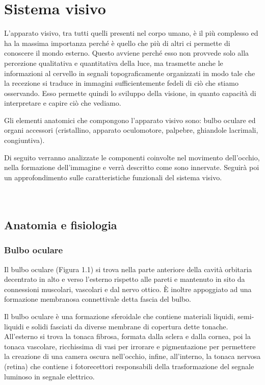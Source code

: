 
\chapter{Sistema visivo}

L’apparato visivo, tra tutti quelli presenti nel corpo umano, è il più complesso ed ha la massima importanza perché è quello che più di altri ci permette di conoscere il mondo esterno. Questo avviene perché esso non provvede solo alla percezione qualitativa e quantitativa della luce, ma trasmette anche le informazioni al cervello in segnali topograficamente organizzati in modo tale che la recezione si traduce in immagini sufficientemente fedeli di ciò che stiamo osservando. Esso permette quindi lo sviluppo della visione, in quanto capacità di interpretare e capire ciò che vediamo.

Gli elementi anatomici che compongono l’apparato visivo sono: bulbo oculare ed organi accessori (cristallino, apparato oculomotore, palpebre, ghiandole lacrimali, congiuntiva).

Di seguito verranno analizzate le componenti coinvolte nel movimento dell’occhio, nella formazione dell’immagine e verrà descritto come sono innervate. Seguirà  poi un approfondimento sulle caratteristiche funzionali del sistema visivo.
\\\ \\\
\section{Anatomia e fisiologia}

\subsection{Bulbo oculare}

Il bulbo oculare (Figura 1.1) si trova nella parte anteriore della cavità orbitaria decentrato in alto e verso l’esterno rispetto alle pareti e mantenuto in sito da connessioni muscolari, vascolari e dal nervo ottico. È inoltre appoggiato ad una formazione membranosa connettivale detta fascia del bulbo. 

Il bulbo oculare è una formazione sferoidale che contiene materiali liquidi, semi-liquidi e solidi fasciati da diverse membrane di copertura dette tonache. All’esterno si trova la tonaca fibrosa, formata dalla sclera e dalla cornea, poi la tonaca vascolare, ricchissima di vasi per irrorare e pigmentazione per permettere la creazione di una camera oscura nell’occhio, infine, all’interno, la tonaca nervosa (retina) che contiene i fotorecettori responsabili della trasformazione del segnale luminoso in segnale elettrico.

